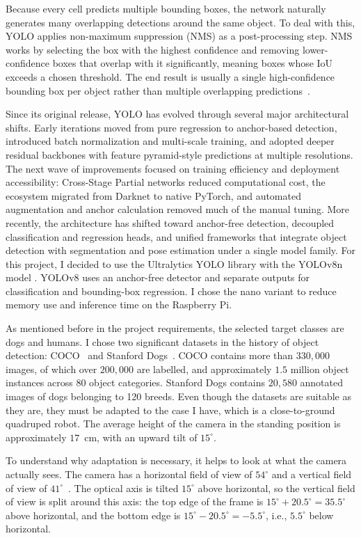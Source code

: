 \documentclass[a4paper,12pt]{report}
\begin{document}
Because every cell predicts multiple bounding boxes, the network naturally generates many
overlapping detections around the same object. To deal with this, YOLO applies non-maximum
suppression (NMS) as a post-processing step. NMS works by selecting the box with the highest
confidence and removing lower-confidence boxes that overlap with it significantly, meaning boxes
whose IoU exceeds a chosen threshold. The end result is usually a single high-confidence bounding
box per object rather than multiple overlapping predictions~\parencite{yolo}.

Since its original release, YOLO has evolved through several major architectural shifts. Early
iterations moved from pure regression to anchor-based detection, introduced batch normalization
and multi-scale training, and adopted deeper residual backbones with feature pyramid-style
predictions at multiple resolutions. The next wave of improvements focused on training efficiency
and deployment accessibility: Cross-Stage Partial networks reduced computational cost, the
ecosystem migrated from Darknet to native PyTorch, and automated augmentation and anchor
calculation removed much of the manual tuning. More recently, the architecture has shifted toward
anchor-free detection, decoupled classification and regression heads, and unified frameworks that
integrate object detection with segmentation and pose estimation under a single model family. For
this project, I decided to use the Ultralytics YOLO library with the YOLOv8n model
\parencite{ultralytics}. YOLOv8 uses an anchor-free detector and separate outputs for classification
and bounding-box regression. I chose the nano variant to reduce memory use and inference time on the
Raspberry Pi.

As mentioned before in the project requirements, the selected target classes are dogs and humans.
I chose two significant datasets in the history of object detection: COCO~\parencite{coco} and
Stanford Dogs~\parencite{stanforddogs}. COCO contains more than $330,000$ images, of which over
$200,000$ are labelled, and approximately $1.5$ million object instances across 80 object
categories. Stanford Dogs contains $20,580$ annotated images of dogs belonging to 120 breeds. Even
though the datasets are suitable as they are, they must be adapted to the case I have, which is a
close-to-ground quadruped robot. The average height of the camera in the standing position is
approximately $17$~cm, with an upward tilt of $15^\circ$.

To understand why adaptation is necessary, it helps to look at what the camera actually sees. The
camera has a horizontal field of view of $54^\circ$ and a vertical field of view of
$41^\circ$~\parencite{cameraV1}. The optical axis is tilted $15^\circ$ above horizontal, so the
vertical field of view is split around this axis: the top edge of the frame is
$15^\circ + 20.5^\circ = 35.5^\circ$ above horizontal, and the bottom edge is
$15^\circ - 20.5^\circ = -5.5^\circ$, i.e., $5.5^\circ$ below horizontal.
\end{document}
